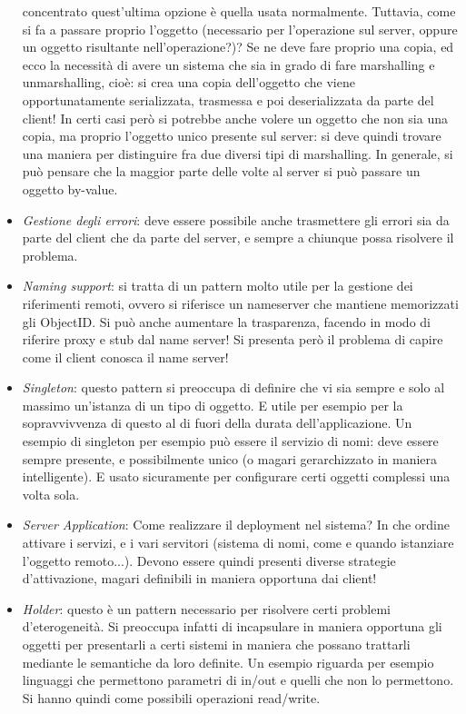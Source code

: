 \begin{itemize}
 concentrato quest'ultima opzione è quella usata normalmente. Tuttavia, come si fa a passare proprio l'oggetto
 (necessario per l'operazione sul server, oppure un oggetto risultante nell'operazione?)? Se ne deve fare proprio una
 copia, ed ecco la necessità di avere un sistema che sia in grado di fare marshalling e unmarshalling, cioè: si crea 
 una copia dell'oggetto che viene opportunatamente serializzata, trasmessa e poi deserializzata da parte del client! 
 In certi casi però si potrebbe anche volere un oggetto che non sia una copia, ma proprio l'oggetto unico presente 
 sul server: si deve quindi trovare una maniera per distinguire fra due diversi tipi di marshalling. In generale, si 
 può pensare che la maggior parte delle volte al server si può passare un oggetto by-value.
 \item \textit{Gestione degli errori}: deve essere possibile anche trasmettere gli errori sia da parte del client che
 da parte del server, e sempre a chiunque possa risolvere il problema.
 \item \textit{Naming support}: si tratta di un pattern molto utile per la gestione dei riferimenti remoti, ovvero si
 riferisce un nameserver che mantiene memorizzati gli ObjectID. Si può anche aumentare la trasparenza, facendo in
 modo di riferire proxy e stub dal name server! Si presenta però il problema di capire come il client conosca il name
 server!
 \item \textit{Singleton}: questo pattern si preoccupa di definire che vi sia sempre e solo al massimo un'istanza di 
 un tipo di oggetto. E utile per esempio per la sopravvivvenza di questo al di fuori della durata dell'applicazione. 
 Un esempio di singleton per esempio può essere il servizio di nomi: deve essere sempre presente, e possibilmente unico
 (o magari gerarchizzato in maniera intelligente). E usato sicuramente per configurare certi oggetti complessi una 
 volta sola.
 \item \textit{Server Application}: Come realizzare il deployment nel sistema? In che ordine attivare i servizi, e i
 vari servitori (sistema di nomi, come e quando istanziare l'oggetto remoto...). Devono essere quindi presenti
 diverse strategie d'attivazione, magari definibili in maniera opportuna dai client!
 \item \textit{Holder}: questo è un pattern necessario per risolvere certi problemi d'eterogeneità. Si preoccupa 
 infatti di incapsulare in maniera opportuna gli oggetti per presentarli a certi sistemi in maniera che possano
 trattarli mediante le semantiche da loro definite. Un esempio riguarda per esempio linguaggi che permettono parametri
 di in/out e quelli che non lo permettono. Si hanno quindi come possibili operazioni read/write.
\end{itemize}
